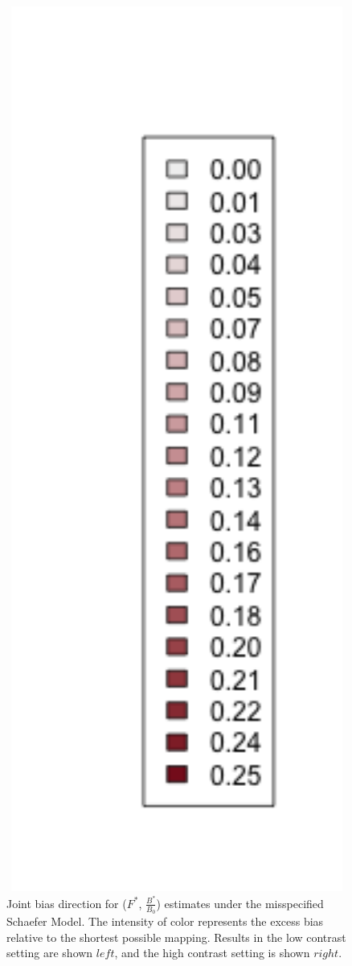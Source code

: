 \begin{figure}[h!]
\begin{minipage}[h!]{0.44\textwidth}
\end{minipage}
\begin{minipage}[h!]{0.09\textwidth}
\hspace{-1cm}
\includegraphics[width=1.5\textwidth]{../ptNew/subLegnd.png}
\end{minipage}
\caption{
Joint bias direction for ($F^*$, $\frac{B^*}{B_0}$) estimates under
the misspecified Schaefer Model. The intensity of color represents the excess
bias relative to the shortest possible mapping. Results in the low contrast setting
are shown $left$, and the high contrast setting is shown $right$.
}
\label{arrowsPT}
\end{figure}

